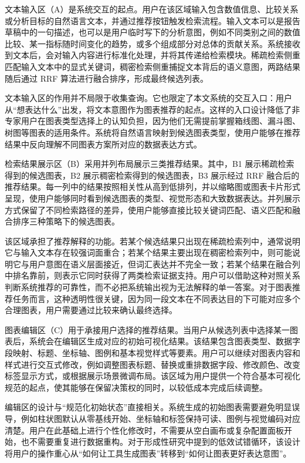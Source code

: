 文本输入区（A）是系统交互的起点。用户在该区域输入包含数值信息、比较关系或分析目标的自然语言文本，并通过推荐按钮触发检索流程。输入文本可以是报告草稿中的一句描述，也可以是用户临时写下的分析意图，例如不同类别之间的数值比较、某一指标随时间变化的趋势，或多个组成部分对总体的贡献关系。系统接收到文本后，会对输入内容进行标准化处理，并将其传递给检索模块。稀疏检索侧重匹配输入文本中的显式关键词，稠密检索侧重捕捉文本背后的语义意图，两路结果随后通过 RRF 算法进行融合排序，形成最终候选列表。

文本输入区的作用并不局限于收集查询。它也限定了本文系统的交互入口：用户从“想表达什么”出发，将文本意图作为图表推荐的起点。这样的入口设计降低了非专家用户在图表类型选择上的认知负担，因为他们无需提前掌握箱线图、漏斗图、树图等图表的适用条件。系统将自然语言映射到候选图表类型，使用户能够在推荐结果中反向理解不同图表方案所对应的数据表达方式。

检索结果展示区（B）采用并列布局展示三类推荐结果。其中，B1 展示稀疏检索得到的候选图表，B2 展示稠密检索得到的候选图表，B3 展示经过 RRF 融合后的推荐结果。每一列中的结果按照相关性从高到低排列，并以缩略图或图表卡片形式呈现，使用户能够同时看到候选图表的类型、视觉形态和大致数据表达。并列展示方式保留了不同检索路径的差异，使用户能够直接比较关键词匹配、语义匹配和融合排序三种策略下的候选图表。

该区域承担了推荐解释的功能。若某个候选结果只出现在稀疏检索列中，通常说明它与输入文本存在较强词面重合；若某个结果主要出现在稠密检索列中，则可能说明它与用户意图在语义层面接近，但词汇表达并不完全一致；若某个结果在融合列中排名靠前，则表示它同时获得了两类检索证据支持。用户可以借助这种对照关系判断系统推荐的可靠性，而不必把系统输出视为无法解释的单一答案。对于图表推荐任务而言，这种透明性很关键，因为同一段文本在不同表达目的下可能对应多个合理图表，用户需要通过比较来确认最终选择。

图表编辑区（C）用于承接用户选择的推荐结果。当用户从候选列表中选择某一图表后，系统会在编辑区生成对应的初始可视化结果。该结果包含图表类型、数据字段映射、标题、坐标轴、图例和基本视觉样式等要素。用户可以继续对图表内容和样式进行交互式修改，例如调整图表标题、替换或重排数据字段、修改颜色、改变标签显示方式，或根据展示场景微调布局。该区域为用户提供一个符合基本可视化规范的起点，使其能够在保留决策权的同时，以较低成本完成后续调整。

编辑区的设计与“规范化初始状态”直接相关。系统生成的初始图表需要避免明显误导，例如柱状图默认从零基线开始、坐标轴和标签保持可读、图例与视觉编码对应清楚。用户在此基础上进行个性化修改时，不需要从空白画布或复杂配置面板开始，也不需要重复进行数据重构。对于形成性研究中提到的低效试错循环，该设计将用户的操作重心从“如何让工具生成图表”转移到“如何让图表更好表达意图”。

